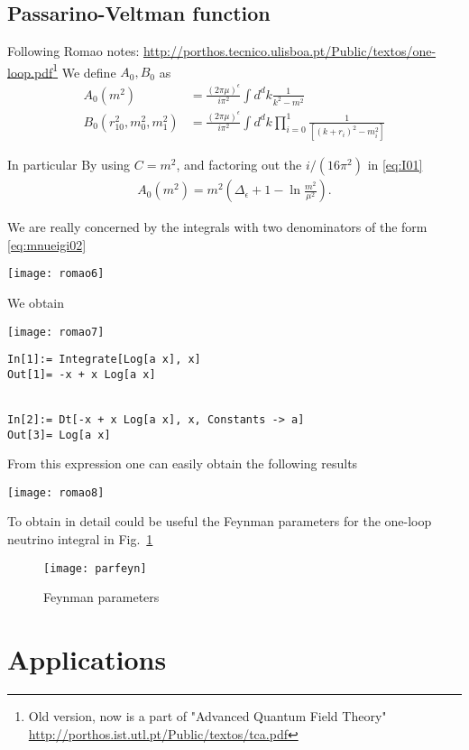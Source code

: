 \subsection{Passarino-Veltman function}
Following Romao notes: \url{http://porthos.tecnico.ulisboa.pt/Public/textos/one-loop.pdf}\footnote{Old version, now is a part of "Advanced Quantum Field Theory" \url{http://porthos.ist.utl.pt/Public/textos/tca.pdf}} We define $A_0, B_0$ as
\begin{align}
  A_{0}\left(m^{2}\right) &=\frac{(2 \pi \mu)^{\epsilon}}{i \pi^{2}} \int d^{d} k \frac{1}{k^{2}-m^{2}} \\
  B_{0}\left(r_{10}^{2}, m_{0}^{2}, m_{1}^{2}\right) &=\frac{(2 \pi \mu)^{\epsilon}}{i \pi^{2}} \int d^{d} k \prod_{i=0}^{1} \frac{1}{\left[\left(k+r_{i}\right)^{2}-m_{i}^{2}\right]} \end{align}


In particular
By using $C=m^2$, and factoring out the $i/\left( 16\pi^2 \right)$ in \eqref{eq:I01}
\begin{align}
  A_{0}\left(m^{2}\right)=m^{2}\left(\Delta_{\epsilon}+1-\ln \frac{m^{2}}{\mu^{2}}\right).
\end{align}

We are really concerned by  the integrals with two denominators of the form \eqref{eq:mnueigi02}


\texttt{[image: romao6]}


We obtain

\texttt{[image: romao7]}

\begin{verbatim}
In[1]:= Integrate[Log[a x], x]
Out[1]= -x + x Log[a x]


In[2]:= Dt[-x + x Log[a x], x, Constants -> a]
Out[3]= Log[a x]
\end{verbatim}
From this expression one can easily obtain the following results

\texttt{[image: romao8]}


To obtain in detail could be useful the Feynman parameters for the one-loop neutrino integral in Fig.~\ref{fig:fp}

\begin{figure}
  \centering
  \texttt{[image: parfeyn]}
  \caption{Feynman parameters}
  \label{fig:fp}
\end{figure}



\section{Applications}


